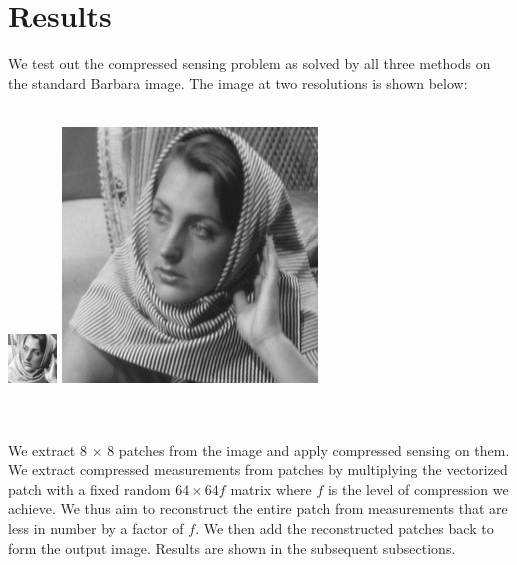 \documentclass[letterpaper, 10 pt, conference]{article}
\begin{document}
\section{Results}
We test out the compressed sensing problem as solved by all three methods on the standard Barbara image. The image at two resolutions is shown below: \\ \\
\centerline{\includegraphics[scale=2.6]{barbara} \includegraphics[scale=0.5]{barbara256}} \\ \\ 
We extract 8 $\times$ 8 patches from the image and apply compressed sensing on them. We extract compressed measurements from patches by multiplying the vectorized patch with a fixed random $64 \times 64f$ matrix where $f$ is the level of compression we achieve. We thus aim to reconstruct the entire patch from measurements that are less in number by a factor of $f$. We then add the reconstructed patches back to form the output image. Results are shown in the subsequent subsections.

\newpage
\end{document}
